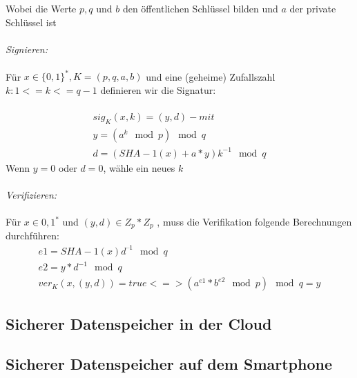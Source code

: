 Wobei die Werte $p, q$ und $b$ den öffentlichen Schlüssel bilden und
$a$ der private Schlüssel ist
\\\\
\textit{Signieren:} 
\\\\
Für $x \in \{0,1\}^*, K = (p, q,  a, b)$ und eine (geheime) Zufallszahl $k: 1<=k<= q-1$
definieren wir die Signatur:
\\\\
\begin{equation}
	\begin{split}
		sig_K(x,k)=(y,d)-    mit	\\	
	y=(a^k \mod p) \mod q \\
			d=(SHA-1(x)+a*y)k^{-1} \mod q 
 	\end{split}
\end{equation}
Wenn $y = 0$ oder $d = 0$, wähle ein neues $k$	
\\\\
\textit{Verifizieren:}
\\\\
Für $x \in {0,1}^*$ und $(y, d) \in Z_p * Z_p$ , muss die Verifikation folgende
Berechnungen durchführen:
\begin{equation}
\begin{split}
		e1 = SHA-1(x) d^{–1} \mod q	\\	
		e2 = y*d^{-1} \mod q \\
			ver_K(x, (y,d)) = true <=> (a^{e1}*b^{e2} \mod p) \mod q = y 
\end{split}
\end{equation}
\subsection*{Sicherer Datenspeicher in der Cloud}

\subsection*{Sicherer Datenspeicher auf dem Smartphone}